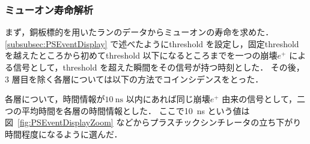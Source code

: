 \subsubsection{ミューオン寿命解析}
\label{subsubsec:PSLife}

まず，銅板標的を用いたランのデータからミューオンの寿命を求めた．
\ref{subsubsec:PSEventDisplay} で述べたようにthreshold を設定し，固定threshold を越えたところから初めてthreshold 以下になるところまでを一つの崩壊$e^{+}$ による信号として，threshold を超えた瞬間をその信号が持つ時刻とした．
その後，3 層目を除く各層については以下の方法でコインシデンスをとった．

各層について，時間情報が$10~\mathrm{ns}$ 以内にあれば同じ崩壊$e^{+}$ 由来の信号として，二つの平均時間を各層の時間情報とした．
ここで10~ns という値は図~\ref{fig:PSEventDisplayZoom} などからプラスチックシンチレータの立ち下がり時間程度になるように選んだ．

